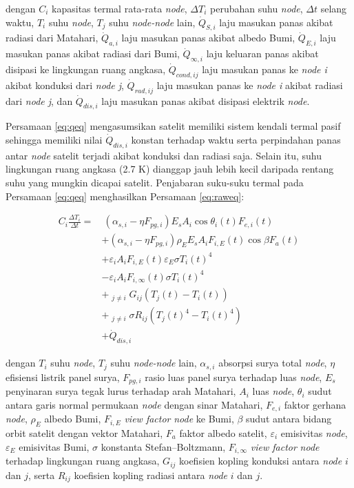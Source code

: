 dengan $C_i$ kapasitas termal rata-rata \textit{node}, $\Delta T_i$ perubahan
suhu \textit{node}, $\Delta t$ selang waktu, $T_i$ suhu \textit{node}, $T_j$
suhu \textit{node-node} lain, $\dot{Q}_{S,i}$ laju masukan panas akibat radiasi dari
Matahari, $\dot{Q}_{a,i}$ laju masukan panas akibat albedo Bumi,
$\dot{Q}_{E,i}$ laju masukan panas akibat radiasi dari Bumi, $\dot{Q}_{\infty,i}$
laju keluaran panas akibat disipasi ke lingkungan ruang angkasa,
$\dot{Q}_{cond,ij}$ laju masukan panas ke \textit{node i} akibat konduksi dari \textit{node j},
$\dot{Q}_{rad,ij}$ laju masukan panas ke \textit{node i} akibat radiasi dari
\textit{node j}, dan  $\dot{Q}_{dis,i}$ laju masukan panas akibat disipasi
elektrik \textit{node}.

Persamaan \ref{eq:qeq} mengasumsikan satelit memiliki sistem kendali termal
pasif sehingga memiliki nilai $\dot{Q}_{dis,i}$ konstan terhadap waktu serta
perpindahan panas antar \textit{node} satelit terjadi akibat konduksi dan
radiasi saja. Selain itu, suhu lingkungan ruang angkasa (2.7 K) dianggap jauh
lebih kecil daripada rentang suhu yang mungkin dicapai satelit. Penjabaran
suku-suku termal pada Persamaan \ref{eq:qeq} menghasilkan Persamaan
\ref{eq:raweq}:

\begin{equation}
\label{eq:raweq}
\begin{split}
	C_{i} \frac{\Delta T_i}{\Delta t} = &\ \left(\alpha_{s,i} - \eta F_{pg,i}\right) E_s A_i \cos{\theta_{i}(t)} F_{e,i}(t) \\
	&+ \left(\alpha_{s,i} - \eta F_{pg,i}\right)\rho_{E} E_s A_i F_{i,E}(t) \cos{\beta} F_a(t) \\
	&+ \varepsilon_i A_i F_{i,E}(t) \varepsilon_E \sigma T_{i}(t)^4 \\
	&- \varepsilon_i A_i F_{i,\infty}(t) \sigma T_{i}(t)^4 \\
	&+ \mathop{\sum_{j=1}^{N}}_{j \neq i} G_{ij} \left(T_j(t) - T_i(t)\right) \\
	&+ \mathop{\sum_{j=1}^{N}}_{j \neq i} \sigma R_{ij}(T_{j}(t)^4-T_{i}(t)^4) \\
	&+ \dot{Q}_{dis,i}
\end{split}
\end{equation}

dengan $T_i$ suhu \textit{node}, $T_j$ suhu \textit{node-node} lain,
$\alpha_{s,i}$ absorpsi surya total \textit{node}, $\eta$ efisiensi listrik panel surya,
$F_{pg,i}$ rasio luas panel surya terhadap luas \textit{node}, $E_s$ penyinaran surya
tegak lurus terhadap arah Matahari, $A_i$ luas \textit{node}, $\theta_i$ sudut antara
garis normal permukaan \textit{node} dengan sinar Matahari, $F_{e,i}$ faktor gerhana
\textit{node}, $\rho_E$ albedo Bumi, $F_{i,E}$ \textit{view factor} \textit{node} ke Bumi, $\beta$ sudut
antara bidang orbit satelit dengan vektor Matahari, $F_a$ faktor albedo
satelit, $\varepsilon_i$ emisivitas \textit{node}, $\varepsilon_E$ emisivitas Bumi, $\sigma$
konstanta Stefan–Boltzmann, $F_{i,\infty}$ \textit{view factor} \textit{node} terhadap
lingkungan ruang angkasa, $G_{ij}$ koefisien kopling konduksi antara \textit{node} $i$
dan $j$, serta $R_{ij}$ koefisien kopling radiasi antara \textit{node} $i$ dan $j$.

